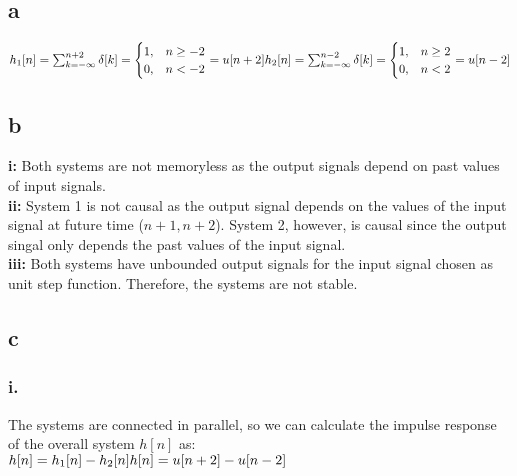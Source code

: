 \documentclass[12pt]{article}
\begin{document}
    \subsection*{a}
    \begin{math}
      h_1[n] = \sum_{k = -\infty}^{n+2}\delta [k] =
      \begin{cases}
        1,& n\geq -2\\
        0,& n < -2
    \end{cases} 
     = u[n+2]\\
     h_2[n] = \sum_{k = -\infty}^{n-2}\delta [k] =
     \begin{cases}
       1,& n\geq 2\\
       0,& n < 2
   \end{cases} 
    = u[n-2]
    \end{math}
    \subsection*{b}
    \textbf{i: }Both systems are not memoryless as the output 
    signals depend on past values of input signals.\\
    \textbf{ii: }System 1 is not causal as the output signal depends
    on the values of the input signal at future time (\(n+1,n+2\)).
    System 2, however, is causal since the output singal only 
    depends the past values of the input signal.\\
    \textbf{iii: }Both systems have unbounded output signals for the input
    signal chosen as unit step function. Therefore, the 
    systems are not stable.
    \subsection*{c}
    \subsubsection*{i.}
    The systems are connected in parallel, so we can calculate 
    the impulse response of the overall system \(h[n]\) as:\\
    \begin{math}
      h[n] = h_1[n] - h_2[n]\\
      h[n] = u[n+2] - u[n-2]\\
    \end{math}
\end{document}
